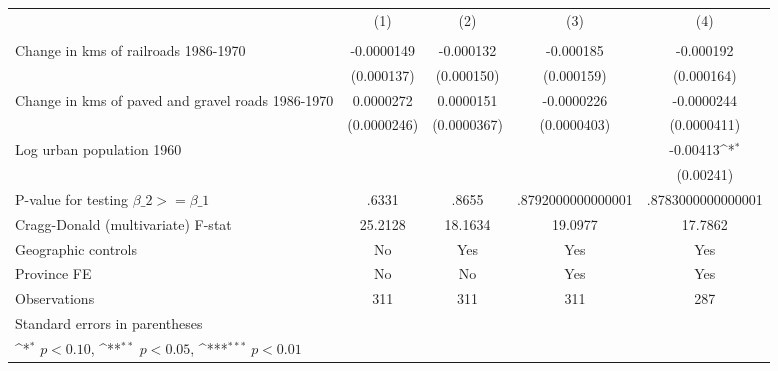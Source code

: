 {
\def\sym#1{\ifmmode^{#1}\else\(^{#1}\)\fi}
\begin{tabular}{l*{4}{c}}
\hline\hline
                &\multicolumn{1}{c}{(1)}&\multicolumn{1}{c}{(2)}&\multicolumn{1}{c}{(3)}&\multicolumn{1}{c}{(4)}\\
                &\multicolumn{1}{c}{}&\multicolumn{1}{c}{}&\multicolumn{1}{c}{}&\multicolumn{1}{c}{}\\
\hline
Change in kms of railroads 1986-1970&-0.0000149         &-0.000132         &-0.000185         &-0.000192         \\
                &(0.000137)         &(0.000150)         &(0.000159)         &(0.000164)         \\
[1em]
Change in kms of paved and gravel roads 1986-1970&0.0000272         &0.0000151         &-0.0000226         &-0.0000244         \\
                &(0.0000246)         &(0.0000367)         &(0.0000403)         &(0.0000411)         \\
[1em]
Log urban population 1960&                  &                  &                  & -0.00413\sym{*}  \\
                &                  &                  &                  &(0.00241)         \\
\hline
P-value for testing $\beta\_{2} >= \beta\_{1}$&    .6331         &    .8655         &.8792000000000001         &.8783000000000001         \\
Cragg-Donald (multivariate) F-stat&  25.2128         &  18.1634         &  19.0977         &  17.7862         \\
Geographic controls&       No         &      Yes         &      Yes         &      Yes         \\
Province FE     &       No         &       No         &      Yes         &      Yes         \\
Observations    &      311         &      311         &      311         &      287         \\
\hline\hline
\multicolumn{5}{l}{\footnotesize Standard errors in parentheses}\\
\multicolumn{5}{l}{\footnotesize \sym{*} \(p<0.10\), \sym{**} \(p<0.05\), \sym{***} \(p<0.01\)}\\
\end{tabular}
}
